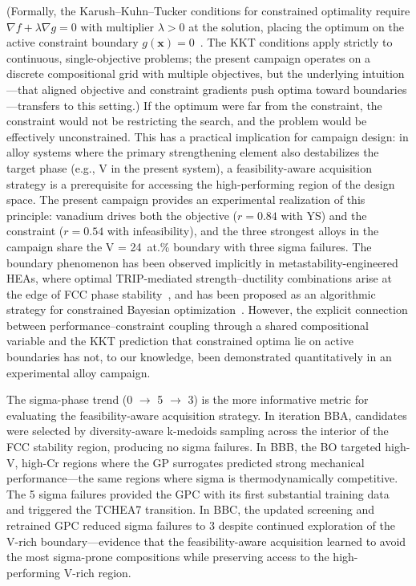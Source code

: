 (Formally, the Karush--Kuhn--Tucker conditions for constrained optimality require $\nabla f + \lambda \nabla g = 0$ with multiplier $\lambda > 0$ at the solution, placing the optimum on the active constraint boundary $g(\mathbf{x}) = 0$~\cite{nocedal2006numerical}. The KKT conditions apply strictly to continuous, single-objective problems; the present campaign operates on a discrete compositional grid with multiple objectives, but the underlying intuition---that aligned objective and constraint gradients push optima toward boundaries---transfers to this setting.) If the optimum were far from the constraint, the constraint would not be restricting the search, and the problem would be effectively unconstrained. This has a practical implication for campaign design: in alloy systems where the primary strengthening element also destabilizes the target phase (e.g., V in the present system), a feasibility-aware acquisition strategy is a prerequisite for accessing the high-performing region of the design space. The present campaign provides an experimental realization of this principle: vanadium drives both the objective ($r = 0.84$ with YS) and the constraint ($r = 0.54$ with infeasibility), and the three strongest alloys in the campaign share the V = 24~at.\% boundary with three sigma failures. The boundary phenomenon has been observed implicitly in metastability-engineered HEAs, where optimal TRIP-mediated strength--ductility combinations arise at the edge of FCC phase stability~\cite{li2016metastable}, and has been proposed as an algorithmic strategy for constrained Bayesian optimization~\cite{tian2024boundary, maguire2025good}. However, the explicit connection between performance--constraint coupling through a shared compositional variable and the KKT prediction that constrained optima lie on active boundaries has not, to our knowledge, been demonstrated quantitatively in an experimental alloy campaign.

The sigma-phase trend (0 $\rightarrow$ 5 $\rightarrow$ 3) is the more informative metric for evaluating the feasibility-aware acquisition strategy. In iteration BBA, candidates were selected by diversity-aware k-medoids sampling across the interior of the FCC stability region, producing no sigma failures. In BBB, the BO targeted high-V, high-Cr regions where the GP surrogates predicted strong mechanical performance---the same regions where sigma is thermodynamically competitive. The 5 sigma failures provided the GPC with its first substantial training data and triggered the TCHEA7 transition. In BBC, the updated screening and retrained GPC reduced sigma failures to 3 despite continued exploration of the V-rich boundary---evidence that the feasibility-aware acquisition learned to avoid the most sigma-prone compositions while preserving access to the high-performing V-rich region.

